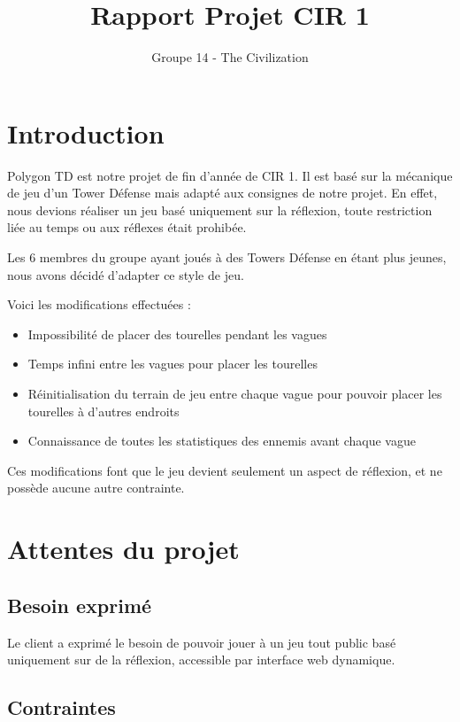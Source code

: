 \documentclass{article}
\title{Rapport Projet CIR 1}
\author{Groupe 14 - The Civilization}
\begin{document}
\maketitle
\tableofcontents
\section{Introduction}

Polygon TD est notre projet de fin d'année de CIR 1. 
Il est basé sur la mécanique de jeu d'un Tower Défense mais adapté aux consignes de notre projet.
En effet, nous devions réaliser un jeu basé uniquement sur la réflexion, toute restriction liée au temps ou aux réflexes était prohibée.

Les 6 membres du groupe ayant joués à des Towers Défense en étant plus jeunes, nous avons décidé d'adapter ce style de jeu.\newline

Voici les modifications effectuées :
\begin{itemize}
    \item Impossibilité de placer des tourelles pendant les vagues
    \item Temps infini entre les vagues pour placer les tourelles
    \item Réinitialisation du terrain de jeu entre chaque vague pour pouvoir placer les tourelles à d'autres endroits
    \item Connaissance de toutes les statistiques des ennemis avant chaque vague\newline
\end{itemize}

Ces modifications font que le jeu devient seulement un aspect de réflexion, et ne possède aucune autre contrainte.


\section{Attentes du projet}

\subsection{Besoin exprimé}

Le client a exprimé le besoin de pouvoir jouer à un jeu tout public basé uniquement sur de la réflexion, accessible par interface web dynamique.

\subsection{Contraintes}
\end{document}

